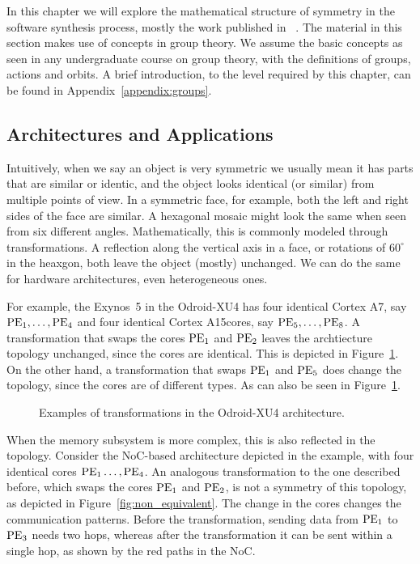 In this chapter we will explore the mathematical structure of symmetry in the software synthesis process, mostly the work published in ~\cite{goens_iess15,goens_taco17,goens_scopes17,goens_mcsoc18,goens_tcad21}.
The material in this section makes use of concepts in group theory.
We assume the basic concepts as seen in any undergraduate course on group
theory, with the definitions of groups, actions and orbits.
A brief introduction, to the level required by this chapter, can be found in Appendix~\ref{appendix:groups}. 

\subsection{Architectures and Applications}
\label{sec:arch_app_symmetries}

Intuitively, when we say an object is very symmetric we usually mean it has parts that are similar or identic, and the object looks identical (or similar) from multiple points of view.
In a symmetric face, for example, both the left and right sides of the face are similar. A hexagonal mosaic might look the same when seen from six different angles.
Mathematically, this is commonly modeled through transformations. A reflection along the vertical axis in a face, or rotations of $60^\circ$ in the heaxgon, both leave the object (mostly) unchanged.
We can do the same for hardware architectures, even heterogeneous ones.

For example, the Exynos~5 in the Odroid-XU4 has four identical Cortex A7\texttrademark, say $\operatorname{PE}_1,\ldots,\operatorname{PE}_4$ and four identical Cortex A15\texttrademark cores, say $\operatorname{PE}_5,\ldots,\operatorname{PE}_8$.
A transformation that swaps the cores $\operatorname{PE}_1$ and $\operatorname{PE}_2$ leaves the archtiecture topology unchanged, since the cores are identical. This is depicted in Figure~\ref{fig:exynos_symmetries}.
On the other hand, a transformation that swaps $\operatorname{PE}_1$ and $\operatorname{PE}_5$ does change the topology, since the cores are of different types. As can also be seen in Figure~\ref{fig:exynos_symmetries}.
\begin{figure}[h]
	\centering
\resizebox{0.8\textwidth}{!}{
   \begin{tikzpicture}
     
   \end{tikzpicture}
 }
   \caption{Examples of transformations in the Odroid-XU4 architecture.}
   \label{fig:exynos_symmetries}
\end{figure}

When the memory subsystem is more complex, this is also reflected in the topology. Consider the \ac{NoC}-based architecture depicted in the example, with four identical cores $\operatorname{PE}_1\ldots,\operatorname{PE}_4$.
An analogous transformation to the one described before, which swaps the cores $\operatorname{PE}_1$ and $\operatorname{PE}_2$, is not a symmetry of this topology, as depicted in Figure~\ref{fig:non_equivalent}.
The change in the cores changes the communication patterns.
Before the transformation, sending data from $\operatorname{PE}_1$ to $\operatorname{PE}_3$ needs two hops, whereas after the transformation it can be sent within a single hop, as shown by the red paths in the \ac{NoC}.

